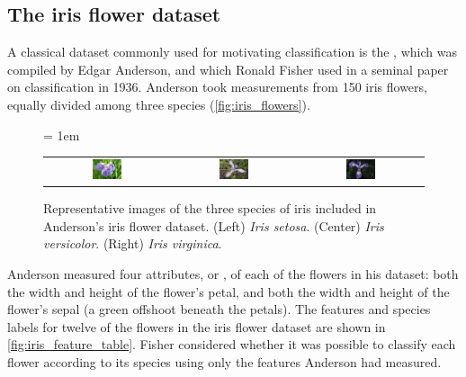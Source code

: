 \FloatBarrier
{}
\subsection{The iris flower dataset}

A classical dataset commonly used for motivating classification is the , which was compiled by Edgar Anderson, and which Ronald Fisher used in a seminal paper on classification in 1936. Anderson took measurements from 150 iris flowers, equally divided among three species (\autoref{fig:iris_flowers}).\\

\begin{figure}[h]
\centering
\tabcolsep = 1em
\mySfFamily
\begin{tabular}{c c c}
\includegraphics[width = 0.25\textwidth]{../images/Iris_setosa_2.jpg} & \includegraphics[width = 0.25\textwidth]{../images/Iris_versicolor.jpg} & \includegraphics[width = 0.25\textwidth]{../images/Iris_virginica.jpg}
\end{tabular}
\caption{Representative images of the three species of iris included in Anderson's iris flower dataset. (Left) \textit{Iris setosa}. (Center)  \textit{Iris versicolor}. (Right) \textit{Iris virginica}.}
\label{fig:iris_flowers}
\end{figure}

Anderson measured four attributes, or , of each of the flowers in his dataset: both the width and height of the flower's petal, and both the width and height of the flower's sepal (a green offshoot beneath the petals). The features and species labels for twelve of the flowers in the iris flower dataset are shown in \autoref{fig:iris_feature_table}. Fisher considered whether it was possible to classify each flower according to its species using only the features Anderson had measured.\\

